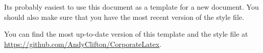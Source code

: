 Its probably easiest to use this document as a template for a new document. You should also make sure that you have the most recent version of the style file.

You can find the most up-to-date version of this template and the style file at \href{https://github.com/AndyClifton/CorporateLatex}{https://github.com/AndyClifton/CorporateLatex}.
